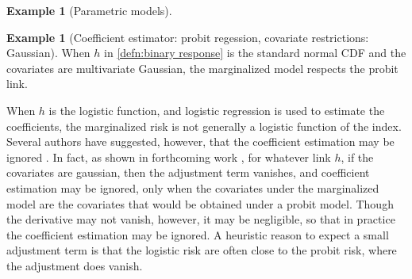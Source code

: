 \documentclass[12pt]{article}
\theoremstyle{definition}
\newtheorem{example}{Example}%
\newtheorem{subexample}{Example}%
\newcommand{\comment}[1]{
  \iftoggle{commenttoggle}{
    {\normalsize{\color{red}{ #1}}\normalsize}
  }
  {}
}
\begin{document}
\begin{example}[Parametric models]



\begin{subexample}[Coefficient estimator: probit regession, covariate
  restrictions: Gaussian] When $h$ in \eqref{defn:binary response} is
  the standard normal CDF and the covariates are multivariate
  Gaussian, the marginalized model respects the probit link.%
\end{subexample}


When $h$ is the logistic function, and logistic regression is used to
estimate the coefficients, the marginalized risk is not generally a
logistic function of the index. Several authors have suggested,
however, that the coefficient estimation may be ignored
\citep{demler2011} \comment{give citations. is this the right demler
  paper?}. In fact, as shown in forthcoming work \comment{or add to
  appendix?}, for whatever link $h$, if the covariates are gaussian,
then the adjustment term vanishes, and coefficient estimation may be
ignored, only when the covariates under the marginalized model are the
covariates that would be obtained under a probit model. Though the
derivative may not vanish, however, it may be negligible, so that in
practice the coefficient estimation may be ignored. A heuristic reason
to expect a small adjustment term is that the logistic risk
are often close to the probit risk, where the adjustment does
vanish.


\end{example}
\end{document}
